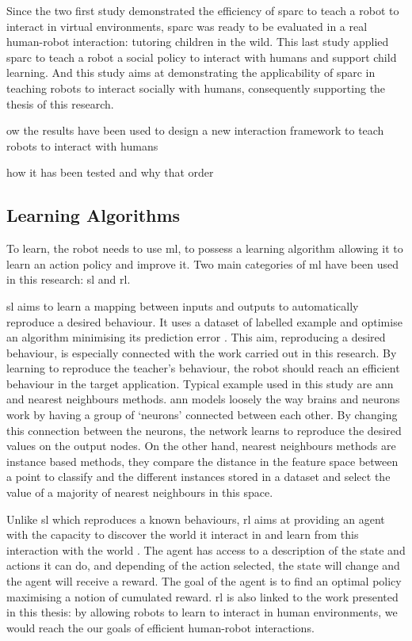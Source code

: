 Since the two first study demonstrated the efficiency of \gls{sparc} to teach a robot to interact in virtual environments, \gls{sparc} was ready to be evaluated in a real human-robot interaction: tutoring children in the wild. This last study applied \gls{sparc} to teach a robot a social policy to interact with humans and support child learning. And this study aims at demonstrating the applicability of \gls{sparc} in teaching robots to interact socially with humans, consequently supporting the thesis of this research.

ow the results have been used to design a new interaction framework to teach robots to interact with humans

how it has been tested and why that order

\subsection{Learning Algorithms}

To learn, the robot needs to use \gls{ml}, to possess a learning algorithm allowing it to learn an action policy and improve it. Two main categories of \gls{ml} have been used in this research: \gls{sl} and \gls{rl}.

\gls{sl} aims to learn a mapping between inputs and outputs to automatically reproduce a desired behaviour. It uses a dataset of labelled example and optimise an algorithm minimising its prediction error \citep{russell2016artificial}. This aim, reproducing a desired behaviour, is especially connected with the work carried out in this research. By learning to reproduce the teacher's behaviour, the robot should reach an efficient behaviour in the target application. Typical example used in this study are \gls{ann} and nearest neighbours methods. \gls{ann} models loosely the way brains and neurons work by having a group of `neurons' connected between each other. By changing this connection between the neurons, the network learns to reproduce the desired values on the output nodes. On the other hand, nearest neighbours methods are instance based methods, they compare the distance in the feature space between a point to classify and the different instances stored in a dataset and select the value of a majority of nearest neighbours in this space.

Unlike \gls{sl} which reproduces a known behaviours, \gls{rl} aims at providing an agent with the capacity to discover the world it interact in and learn from this interaction with the world \citep{sutton1998reinforcement}. The agent has access to a description of the state and actions it can do, and depending of the action selected, the state will change and the agent will receive a reward. The goal of the agent is to find an optimal policy maximising a notion of cumulated reward. \gls{rl} is also linked to the work presented in this thesis: by allowing robots to learn to interact in human environments, we would reach the our goals of efficient human-robot interactions.

